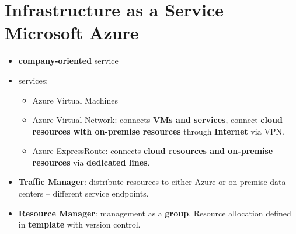 \section{Infrastructure as a Service -- Microsoft Azure}
\begin{itemize}
	\item \textbf{company-oriented} service
	\item services:
	\begin{itemize}
		\item Azure Virtual Machines
		\item Azure Virtual Network: connects \textbf{VMs and services}, connect \textbf{cloud resources with on-premise resources} through \textbf{Internet} via VPN.
		\item Azure ExpressRoute: connects \textbf{cloud resources and on-premise resources} via \textbf{dedicated lines}.
	\end{itemize}
	\item \textbf{Traffic Manager}: distribute resources to either Azure or on-premise data centers -- different service endpoints.
	\item \textbf{Resource Manager}: management as a \textbf{group}. Resource allocation defined in \textbf{template} with version control. 
\end{itemize}
